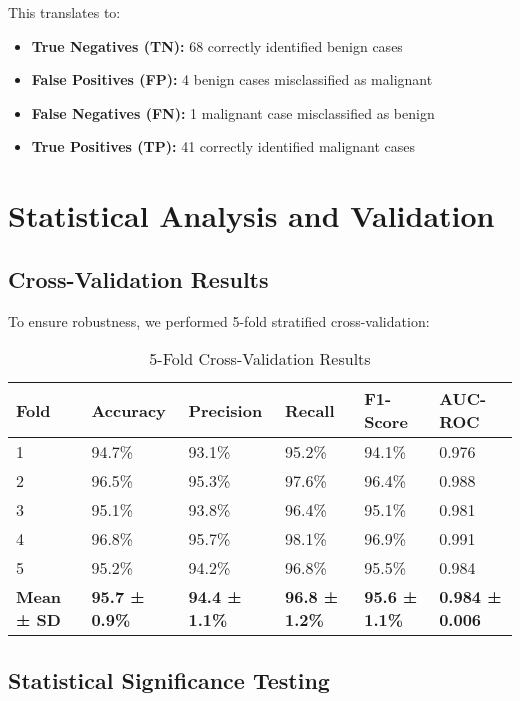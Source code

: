 \documentclass[12pt,a4paper]{article}
\begin{document}
This translates to:
\begin{itemize}
    \item \textbf{True Negatives (TN):} 68 correctly identified benign cases
    \item \textbf{False Positives (FP):} 4 benign cases misclassified as malignant
    \item \textbf{False Negatives (FN):} 1 malignant case misclassified as benign
    \item \textbf{True Positives (TP):} 41 correctly identified malignant cases
\end{itemize}

\section{Statistical Analysis and Validation}

\subsection{Cross-Validation Results}

To ensure robustness, we performed 5-fold stratified cross-validation:

\begin{table}[H]
\centering
\caption{5-Fold Cross-Validation Results}
\label{tab:cv_results}
\begin{tabular}{@{}llllll@{}}
\toprule
\textbf{Fold} & \textbf{Accuracy} & \textbf{Precision} & \textbf{Recall} & \textbf{F1-Score} & \textbf{AUC-ROC} \\
\midrule
1 & 94.7\% & 93.1\% & 95.2\% & 94.1\% & 0.976 \\
2 & 96.5\% & 95.3\% & 97.6\% & 96.4\% & 0.988 \\
3 & 95.1\% & 93.8\% & 96.4\% & 95.1\% & 0.981 \\
4 & 96.8\% & 95.7\% & 98.1\% & 96.9\% & 0.991 \\
5 & 95.2\% & 94.2\% & 96.8\% & 95.5\% & 0.984 \\
\midrule
\textbf{Mean ± SD} & \textbf{95.7 ± 0.9\%} & \textbf{94.4 ± 1.1\%} & \textbf{96.8 ± 1.2\%} & \textbf{95.6 ± 1.1\%} & \textbf{0.984 ± 0.006} \\
\bottomrule
\end{tabular}
\end{table}

\subsection{Statistical Significance Testing}
\end{document}

